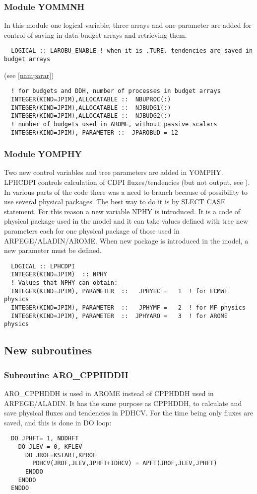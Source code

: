 \subsubsection{Module YOMMNH}
In this module one logical variable, three arrays and one parameter are added for control of saving in data budget arrays and retrieving them.
    \begin{verbatim}
  LOGICAL :: LAROBU_ENABLE ! when it is .TURE. tendencies are saved in budget arrays 
\end{verbatim} (see \ref{namparar})
    \begin{verbatim}
  ! for budgets and DDH, number of processes in budget arrays 
  INTEGER(KIND=JPIM),ALLOCATABLE ::  NBUPROC(:)
  INTEGER(KIND=JPIM),ALLOCATABLE ::  NJBUDG1(:)
  INTEGER(KIND=JPIM),ALLOCATABLE ::  NJBUDG2(:)
  ! number of budgets used in AROME, without passive scalars
  INTEGER(KIND=JPIM), PARAMETER ::  JPAROBUD = 12
    \end{verbatim}

\subsubsection{Module YOMPHY}
Two new control variables and tree parameters are added in YOMPHY. LPHCDPI controls calculation of CDPI fluxes/tendencies (but not output, see \label{NamDDHnew}). In various parts of the code there was a need to branch because of possibility to use several physical packages. The best way to do it is by SLECT CASE statement. For this reason a new variable
NPHY is introduced. It is a code of physical package used in the model and it can take values defined with tree new parameters each for one physical package of those used in ARPEGE/ALADIN/AROME. When new package is introduced in the model, a new parameter must be defined. 
    \begin{verbatim}
  LOGICAL :: LPHCDPI
  INTEGER(KIND=JPIM)  :: NPHY  
  ! Values that NPHY can obtain: 
  INTEGER(KIND=JPIM), PARAMETER  ::   JPHYEC =   1  ! for ECMWF physics
  INTEGER(KIND=JPIM), PARAMETER  ::   JPHYMF =   2  ! for MF physics
  INTEGER(KIND=JPIM), PARAMETER  ::  JPHYARO =   3  ! for AROME physics
    \end{verbatim}
\subsection{New subroutines}

  \subsubsection{Subroutine ARO\_CPPHDDH}
  \label{aro_cpph}
ARO\_CPPHDDH is used in AROME instead of CPPHDDH used in ARPEGE/ALADIN. It has the same purpose as CPPHDDH, to calculate and save physical fluxes and tendencies in PDHCV. For the time being only fluxes are saved, and this is done in DO loop:
    \begin{verbatim}
  DO JPHFT= 1, NDDHFT
    DO JLEV = 0, KFLEV
      DO JROF=KSTART,KPROF
        PDHCV(JROF,JLEV,JPHFT+IDHCV) = APFT(JROF,JLEV,JPHFT)
      ENDDO
    ENDDO 
  ENDDO
    \end{verbatim}

